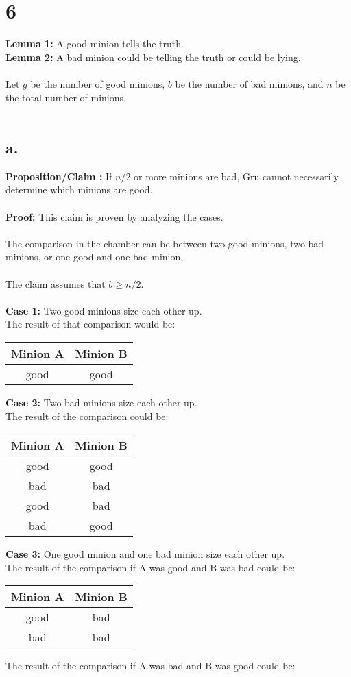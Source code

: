 \documentclass[12pt]{article}
\begin{document}
\section*{6}
\textbf{Lemma 1: }  A good minion tells the truth.\\
\textbf{Lemma 2: } A bad minion could be telling the truth or could be lying.\\
\\
Let $g$ be the number of good minions, $b$ be the number of bad minions, and $n$ be the total number of minions.\\
\\
\subsection*{a.}
\textbf{Proposition/Claim :} 
If $n/2$ or more minions are bad, Gru cannot necessarily determine which minions are good.\\
\\
\textbf{Proof: }  This claim is proven by analyzing the cases.\\
\\
The comparison in the chamber can be between two good minions, two bad minions, or one good and one bad minion.\\
\\
The claim assumes that $b \ge n/2$.\\
\\
\textbf{Case 1: } Two good minions size each other up.\\
The result of that comparison would be:\\
\begin{center}
\begin{tabular}{c|c}
Minion A & Minion B\\
\hline
good & good\\
\end{tabular}
\end{center}
\textbf{Case 2: } Two bad minions size each other up.\\
The result of the comparison could be:
\begin{center}
\begin{tabular}{c|c}
Minion A & Minion B\\
\hline
good & good\\
bad & bad\\
good & bad\\
bad & good\\
\end{tabular}
\end{center}
\textbf{Case 3: } One good minion and one bad minion size each other up.\\
The result of the comparison if A was good and B was bad could be: 
\begin{center}
\begin{tabular}{c|c}
Minion A & Minion B\\
\hline
good & bad\\
bad & bad\\
\end{tabular}
\end{center}
The result of the comparison if A was bad and B was good could be: 
\end{document}
